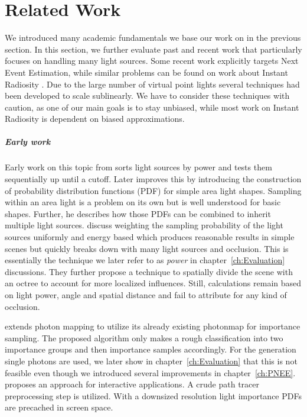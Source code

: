 \chapter{Related Work}
\label{ch:Prev}

We introduced many academic fundamentals we base our work on in the previous section. In this section, we further evaluate past and recent work that particularly focuses on handling many light sources. Some recent work explicitly targets Next Event Estimation, while similar problems can be found on work about Instant Radiosity \parencite{keller1997instant, Walter2005LightcutsAS, dachsbacher2014scalable}. Due to the large number of virtual point lights several techniques had been developed to scale sublinearly. We have to consider these techniques with caution, as one of our main goals is to stay unbiased, while most work on Instant Radiosity is dependent on biased approximations.

\paragraph{Early work}

Early work on this topic from \textcite{ward1994adaptive} sorts light sources by power and tests them sequentially up until a cutoff. Later \textcite{Shirley:1996:MCT:226150.226151} improves this by introducing the construction of probability distribution functions (PDF) for simple area light shapes. Sampling within an area light is a problem on its own but is well understood for basic shapes. Further, he describes how those PDFs can be combined to inherit multiple light sources. \citeauthor{Shirley:1996:MCT:226150.226151} discuss weighting the sampling probability of the light sources uniformly and energy based which produces reasonable results in simple scenes but quickly breaks down with many light sources and occlusion. This is essentially the technique we later refer to as \textit{power} in chapter~\ref{ch:Evaluation} discussions. They further propose a technique to spatially divide the scene with an octree to account for more localized influences. Still, calculations remain based on light power, angle and spatial distance and fail to attribute for any kind of occlusion.

\textcite{DBLP:conf/vmv/KellerW00} extends photon mapping to utilize its already existing photonmap for importance sampling. The proposed algorithm only makes a rough classification into two importance groups and then importance samples accordingly. For the generation single photons are used, we later show in chapter~\ref{ch:Evaluation} that this is not feasible even though we introduced several improvements in chapter~\ref{ch:PNEE}. \textcite{DBLP:conf/rt/WaldBS03} proposes an approach for interactive applications. A crude path tracer preprocessing step is utilized. With a downsized resolution light importance PDFs are precached in screen space. 

